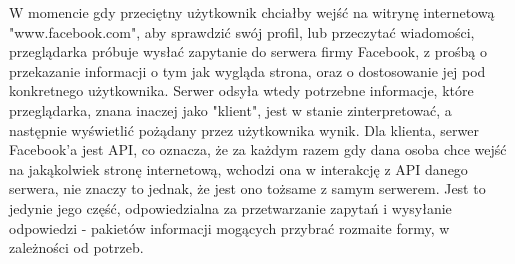 \documentclass[12pt, a4paper]{article}
\begin{document}
\begin{sloppypar}
{{    W momencie gdy przeciętny użytkownik chciałby wejść na witrynę internetową 
    "www.facebook.com", aby sprawdzić swój profil, lub przeczytać wiadomości, 
    przeglądarka próbuje wysłać zapytanie do serwera firmy Facebook, z prośbą o
    przekazanie informacji o tym jak wygląda strona, oraz o dostosowanie jej pod
    konkretnego użytkownika. Serwer odsyła wtedy potrzebne informacje, które przeglądarka,
    znana inaczej jako "klient", jest w stanie zinterpretować, a następnie wyświetlić 
    pożądany przez użytkownika wynik. Dla klienta, serwer Facebook'a jest API, co oznacza,
    że za każdym razem gdy dana osoba chce wejść na jakąkolwiek stronę internetową,
    wchodzi ona w interakcję z API danego serwera, nie znaczy to jednak, że jest ono
    tożsame z samym serwerem. Jest to jedynie jego część, odpowiedzialna za przetwarzanie
    zapytań i wysyłanie odpowiedzi - pakietów informacji mogących przybrać rozmaite formy,
    w zależności od potrzeb.
    
}}
\end{sloppypar}
\end{document}
